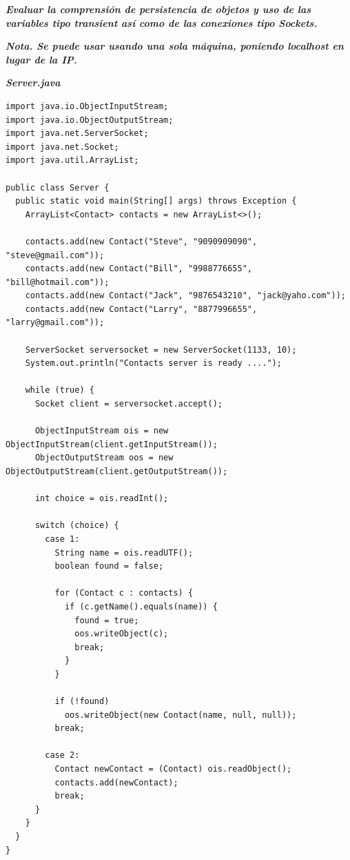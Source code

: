 \documentclass[11pt, twocolumn]{article}
\begin{document}
  \textit{\textbf{Evaluar la comprensión de persistencia de objetos y uso de las variables tipo transient así como de las conexiones tipo \textit{Sockets}.}}

  \textit{\textbf{Nota. Se puede usar usando una sola máquina, poniendo localhost en lugar de la IP.}}

  \textit{\textbf{Server.java}}
  \begin{lstlisting}
import java.io.ObjectInputStream;
import java.io.ObjectOutputStream;
import java.net.ServerSocket;
import java.net.Socket;
import java.util.ArrayList;

public class Server {
  public static void main(String[] args) throws Exception {
    ArrayList<Contact> contacts = new ArrayList<>();

    contacts.add(new Contact("Steve", "9090909090", "steve@gmail.com"));
    contacts.add(new Contact("Bill", "9988776655", "bill@hotmail.com"));
    contacts.add(new Contact("Jack", "9876543210", "jack@yaho.com"));
    contacts.add(new Contact("Larry", "8877996655", "larry@gmail.com"));

    ServerSocket serversocket = new ServerSocket(1133, 10);
    System.out.println("Contacts server is ready ....");

    while (true) {
      Socket client = serversocket.accept();

      ObjectInputStream ois = new ObjectInputStream(client.getInputStream());
      ObjectOutputStream oos = new ObjectOutputStream(client.getOutputStream());

      int choice = ois.readInt();

      switch (choice) {
        case 1: 
          String name = ois.readUTF();
          boolean found = false;

          for (Contact c : contacts) {
            if (c.getName().equals(name)) {
              found = true;
              oos.writeObject(c);
              break; 
            }
          }

          if (!found)
            oos.writeObject(new Contact(name, null, null));
          break;

        case 2: 
          Contact newContact = (Contact) ois.readObject();
          contacts.add(newContact);
          break;
      } 
    }
  }
}
  \end{lstlisting}
\end{document}
